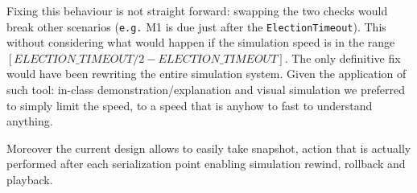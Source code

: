 Fixing this behaviour is not straight forward: swapping the two checks would
break other scenarios (\texttt{e.g.} M1 is due just after the \texttt{ElectionTimeout}).
This without considering what would happen if the simulation speed is in the range
$[ELECTION\_TIMEOUT/2 - ELECTION\_TIMEOUT]$.
The only definitive fix would have been rewriting the entire simulation system.
Given the application of such tool: in-class demonstration/explanation and
visual simulation we preferred to simply limit the speed, to a speed that is
anyhow to fast to understand anything.

Moreover the current design allows to easily take snapshot, action that is
actually performed after each serialization point enabling simulation rewind,
rollback and playback.
